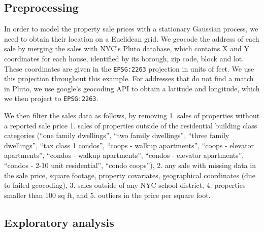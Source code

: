 \documentclass[letter]{article}
\begin{document}
    	\subsection{Preprocessing}\label{preprocessing}

In order to model the property sale prices with a stationary Gaussian
process, we need to obtain their location on a Euclidean grid. We
geocode the address of each sale by merging the sales with NYC's Pluto
database, which contains X and Y coordinates for each house, identified
by its borough, zip code, block and lot. These coordinates are given in
the \texttt{EPSG:2263} projection in units of feet. We use this
projection throughout this example. For addresses that do not find a
match in Pluto, we use google's geocoding API to obtain a latitude and
longitude, which we then project to \texttt{EPSG:2263}.

We then filter the sales data as follows, by removing 1. sales of
properties without a reported sale price 1. sales of properties outside
of the residential building class categories (``one family dwellings'',
``two family dwellings'', ``three family dwellings'', ``tax class 1
condos'', ``coops - walkup apartments'', ``coops - elevator
apartments'', ``condos - walkup apartments'', ``condos - elevator
apartments'', ``condos - 2-10 unit residential'', ``condo coops''), 2.
any sale with missing data in the sale price, square footage, property
covariates, geographical coordinates (due to failed geocoding), 3. sales
outside of any NYC school district, 4. properties smaller than 100 sq
ft, and 5. outliers in the price per square foot.
    


    	\subsection{Exploratory analysis}\label{exploratory-analysis}
\end{document}
